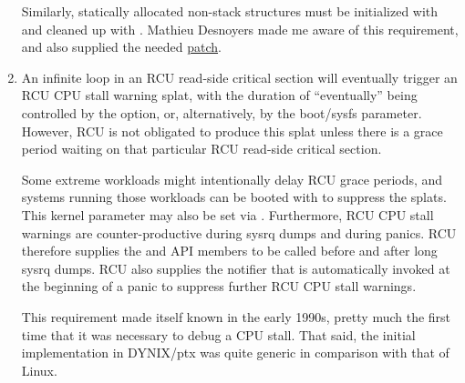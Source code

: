 \begin{enumerate}
   Similarly, statically allocated
   non-stack  structures must be initialized with
    and cleaned up with .
   Mathieu Desnoyers made me aware of this requirement, and also
   supplied the needed
   \href{https://lore.kernel.org/r/20100319013024.GA28456@Krystal}{patch}.
\item An infinite loop in an RCU read-side critical section will eventually
   trigger an RCU CPU stall warning splat, with the duration of
   ``eventually'' being controlled by the 
    option, or, alternatively, by the
    boot/sysfs parameter.
   However, RCU
   is not obligated to produce this splat unless there is a grace period
   waiting on that particular RCU read-side critical section.

   Some extreme workloads might intentionally delay RCU grace periods,
   and systems running those workloads can be booted with
    to suppress the splats.
   This
   kernel parameter may also be set via . Furthermore, RCU CPU
   stall warnings are counter-productive during sysrq dumps and during
   panics.
   RCU therefore supplies the  and
    API members to be called before and after long
   sysrq dumps.
   RCU also supplies the  notifier that is
   automatically invoked at the beginning of a panic to suppress further
   RCU CPU stall warnings.

   This requirement made itself known in the early 1990s, pretty much
   the first time that it was necessary to debug a CPU stall. That said,
   the initial implementation in DYNIX/ptx was quite generic in
   comparison with that of Linux.


\end{enumerate}
